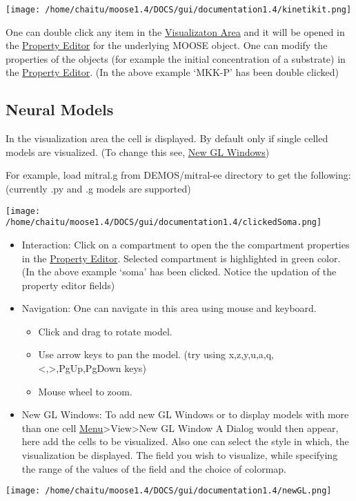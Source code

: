 \documentclass[11pt]{article}
\begin{document}
  \texttt{[image: /home/chaitu/moose1.4/DOCS/gui/documentation1.4/kinetikit.png]}


   One can double click any item in the \hyperref[sec-2]{Visualizaton Area} and it  will be opened in the \hyperref[sec-2]{Property Editor} for the underlying MOOSE object. One can modify the properties of the objects (for example the initial concentration of a substrate) in the \hyperref[sec-2]{Property Editor}. (In the above example `MKK-P' has been double clicked)

   
\subsection{Neural Models}
\label{sec-3.2}

    In the visualization area the cell is displayed. By default only if single celled models are visualized. (To change this see, \hyperref[sec-3.2]{New GL Windows})
    
    For example, load mitral.g from DEMOS/mitral-ee directory to get the following:  (currently .py and .g models are supported) 

  \texttt{[image: /home/chaitu/moose1.4/DOCS/gui/documentation1.4/clickedSoma.png]}
    
\begin{itemize}
\item Interaction: 
      Click on a compartment to open the the compartment properties in the \hyperref[sec-2]{Property Editor}. Selected compartment is highlighted in green color. (In the above example `soma' has been clicked. Notice the updation of the property editor fields)
\item Navigation:
      One can navigate in this area using mouse and keyboard.

\begin{itemize}
\item Click and drag to rotate model.
\item Use arrow keys to pan the model. (try using x,z,y,u,a,q,<,>,PgUp,PgDown keys)
\item Mouse wheel to zoom.
\end{itemize}

\end{itemize}
    
\begin{itemize}
\item New GL Windows:
      To add new GL Windows or to display models with more than one cell \hyperref[sec-2]{Menu}>View>New GL Window  A Dialog would then appear, here add the cells to be visualized. Also one can select the style in which, the visualization be displayed. The field you wish to visualize, while specifying the range of the values of the field and the choice of colormap.
\end{itemize}
  \texttt{[image: /home/chaitu/moose1.4/DOCS/gui/documentation1.4/newGL.png]}
\end{document}
